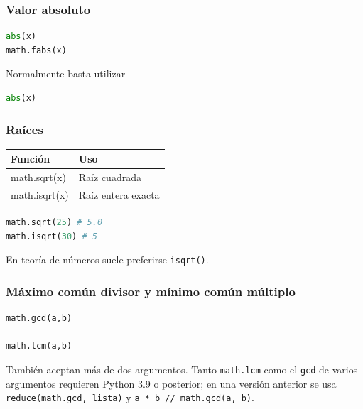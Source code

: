 \vspace{0.3cm}

\subsubsection{Valor absoluto}

\begin{lstlisting}[language=Python]
abs(x)
math.fabs(x)
\end{lstlisting}

Normalmente basta utilizar

\begin{lstlisting}[language=Python]
abs(x)
\end{lstlisting}

\vspace{0.3cm}

\subsubsection{Raíces}

\begin{center}
\begin{tabular}{|l|l|}
\hline
Función & Uso \\ \hline
math.sqrt(x) & Raíz cuadrada \\ \hline
math.isqrt(x) & Raíz entera exacta \\ \hline
\end{tabular}
\end{center}

\begin{lstlisting}[language=Python]
math.sqrt(25) # 5.0
math.isqrt(30) # 5
\end{lstlisting}

En teoría de números suele preferirse \texttt{isqrt()}.

\vspace{0.3cm}

\subsubsection{Máximo común divisor y mínimo común múltiplo}

\begin{lstlisting}[language=Python]
math.gcd(a,b)

math.lcm(a,b)
\end{lstlisting}

También aceptan más de dos argumentos. Tanto \texttt{math.lcm} como el
\texttt{gcd} de varios argumentos requieren Python 3.9 o posterior; en una versión
anterior se usa \texttt{reduce(math.gcd, lista)} y
\texttt{a * b // math.gcd(a, b)}.

